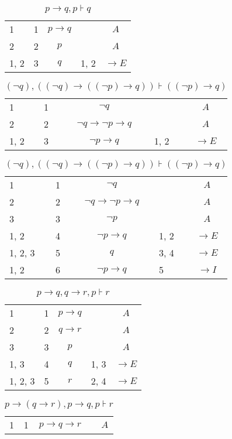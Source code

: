 \documentclass{article}
\begin{document}
\begin{table}[htbp]\caption*{$p→q,p ⊦ q$}\centering\begin{tabular}{lllll}
{1} & 1 & $$p→q$$ & {} & $$A$$ \\
{2} & 2 & $$p$$ & {} & $$A$$ \\
{1, 2} & 3 & $$q$$ & {1, 2} & $$→E$$ \\
\end{tabular}
\end{table}\begin{table}[htbp]\caption*{$(¬q),((¬q)→((¬p)→q)) ⊦ ((¬p)→q)$}\centering\begin{tabular}{lllll}
{1} & 1 & $$¬q$$ & {} & $$A$$ \\
{2} & 2 & $$¬q→ ¬p→q$$ & {} & $$A$$ \\
{1, 2} & 3 & $$¬p→q$$ & {1, 2} & $$→E$$ \\
\end{tabular}
\end{table}\begin{table}[htbp]\caption*{$(¬q),((¬q)→((¬p)→q)) ⊦ ((¬p)→q)$}\centering\begin{tabular}{lllll}
{1} & 1 & $$¬q$$ & {} & $$A$$ \\
{2} & 2 & $$¬q→ ¬p→q$$ & {} & $$A$$ \\
{3} & 3 & $$¬p$$ & {} & $$A$$ \\
{1, 2} & 4 & $$¬p→q$$ & {1, 2} & $$→E$$ \\
{1, 2, 3} & 5 & $$q$$ & {3, 4} & $$→E$$ \\
{1, 2} & 6 & $$¬p→q$$ & {5} & $$→I$$ \\
\end{tabular}
\end{table}\begin{table}[htbp]\caption*{$p→q,q→r,p ⊦ r$}\centering\begin{tabular}{lllll}
{1} & 1 & $$p→q$$ & {} & $$A$$ \\
{2} & 2 & $$q→r$$ & {} & $$A$$ \\
{3} & 3 & $$p$$ & {} & $$A$$ \\
{1, 3} & 4 & $$q$$ & {1, 3} & $$→E$$ \\
{1, 2, 3} & 5 & $$r$$ & {2, 4} & $$→E$$ \\
\end{tabular}
\end{table}\begin{table}[htbp]\caption*{$p→(q→r),p→q,p ⊦ r$}\centering\begin{tabular}{lllll}
{1} & 1 & $$p→q→r$$ & {} & $$A$$ \\

\end{tabular}
\end{table}
\end{document}
